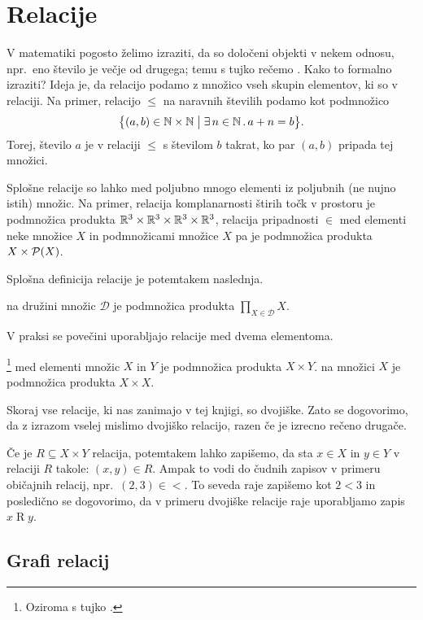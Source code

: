 \chapter{Relacije}\label{POGLAVJE: Relacije}

	V matematiki pogosto želimo izraziti, da so določeni objekti v nekem odnosu, npr.~eno število je večje od drugega; temu s tujko rečemo . Kako to formalno izraziti? Ideja je, da relacijo podamo z množico vseh skupin elementov, ki so v relaciji. Na primer, relacijo $\leq$ na naravnih številih podamo kot podmnožico
	\[\set[1]{(a, b) \in \NN \times \NN}{\xsome{n}[\NN]{a + n = b}}.\]
	Torej, število $a$ je v relaciji $\leq$ s številom $b$ takrat, ko par $(a, b)$ pripada tej množici.
	
	Splošne relacije so lahko med poljubno mnogo elementi iz poljubnih (ne nujno istih) množic. Na primer, relacija komplanarnosti štirih točk v prostoru je podmnožica produkta $\mathbb{R}^3 \times \mathbb{R}^3 \times \mathbb{R}^3 \times \mathbb{R}^3$, relacija pripadnosti $\in$ med elementi neke množice $X$ in podmnožicami množice $X$ pa je podmnožica produkta $X \times \mathcal{P}(X)$.
	
	Splošna definicija relacije je potemtakem naslednja.
	\begin{definicija}
		 na družini množic $\mathscr{D}$ je podmnožica produkta $\prod_{X \in \mathscr{D}} X$.
	\end{definicija}
	
	V praksi se povečini uporabljajo relacije med dvema elementoma.
	\begin{definicija}
		\footnote{Oziroma s tujko .} med elementi množic $X$ in $Y$ je podmnožica produkta $X \times Y$.  na množici $X$ je podmnožica produkta $X \times X$.
	\end{definicija}
	
	Skoraj vse relacije, ki nas zanimajo v tej knjigi, so dvojiške. Zato se dogovorimo, da z izrazom  vselej mislimo dvojiško relacijo, razen če je izrecno rečeno drugače.
	
	Če je $R \subseteq X \times Y$ relacija, potemtakem lahko zapišemo, da sta $x \in X$ in $y \in Y$ v relaciji $R$ takole: $(x, y) \in R$. Ampak to vodi do čudnih zapisov v primeru običajnih relacij, npr.~$(2, 3) \in <$. To seveda raje zapišemo kot $2 < 3$ in posledično se dogovorimo, da v primeru dvojiške relacije raje uporabljamo zapis $x \mathrel{R} y$.
	
	
	\section{Grafi relacij}
	
